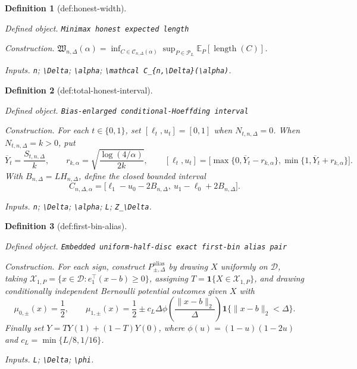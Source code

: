 \documentclass{article}
\newtheorem{definition}{Definition}
\begin{document}
\begin{definition}[def:honest-width]\label{def:honest-width}
\par\smallskip\noindent\emph{Defined object.} \texttt{Minimax honest expected length}
\par\smallskip\noindent\emph{Construction.} \(\mathfrak W_{n,\Delta}(\alpha)=\inf_{C\in\mathcal C_{n,\Delta}(\alpha)}\sup_{P\in\mathcal P_L}\mathbb E_P[\operatorname{length}(C)]\).
\par\smallskip\noindent\emph{Inputs.} \texttt{n}; \texttt{\textbackslash{}\allowbreak{}Delta}; \texttt{\textbackslash{}\allowbreak{}alpha}; \texttt{\textbackslash{}\allowbreak{}mathcal C\_\allowbreak{}\{n,\allowbreak{}\textbackslash{}\allowbreak{}Delta\}\allowbreak{}(\textbackslash{}\allowbreak{}alpha)}.
\end{definition}

\begin{definition}[def:total-honest-interval]\label{def:total-honest-interval}
\par\smallskip\noindent\emph{Defined object.} \texttt{Bias-\allowbreak{}enlarged conditional-\allowbreak{}Hoeffding interval}
\par\smallskip\noindent\emph{Construction.} For each \(t\in\{0,1\}\), set \([\ell_t,u_t]=[0,1]\) when \(N_{t,n,\Delta}=0\).  When \(N_{t,n,\Delta}=k>0\), put
\[
 \overline Y_t=\frac{S_{t,n,\Delta}}k,
 \qquad
 r_{k,\alpha}=\sqrt{\frac{\log(4/\alpha)}{2k}},
 \qquad
 [\ell_t,u_t]=\bigl[\max\{0,\overline Y_t-r_{k,\alpha}\},\min\{1,\overline Y_t+r_{k,\alpha}\}\bigr].
\]
With \(B_{n,\Delta}=LH_{n,\Delta}\), define the closed bounded interval
\[
 C_{n,\Delta,\alpha}
 =\bigl[\ell_1-u_0-2B_{n,\Delta},\ u_1-\ell_0+2B_{n,\Delta}\bigr].
\]
\par\smallskip\noindent\emph{Inputs.} \texttt{n}; \texttt{\textbackslash{}\allowbreak{}Delta}; \texttt{\textbackslash{}\allowbreak{}alpha}; \texttt{L}; \texttt{Z\_\allowbreak{}\textbackslash{}\allowbreak{}Delta}.
\end{definition}

\begin{definition}[def:first-bin-alias]\label{def:first-bin-alias}
\par\smallskip\noindent\emph{Defined object.} \texttt{Embedded uniform-\allowbreak{}half-\allowbreak{}disc exact first-\allowbreak{}bin alias pair}
\par\smallskip\noindent\emph{Construction.} For each sign, construct \(P^{\mathrm{alias}}_{\pm,\Delta}\) by drawing \(X\) uniformly on \(\mathcal D\), taking \(\mathcal X_{1,P}=\{x\in\mathcal D:e_1^{\top}(x-b)\geq0\}\), assigning \(T=\mathbf1\{X\in\mathcal X_{1,P}\}\), and drawing conditionally independent Bernoulli potential outcomes given \(X\) with
\[
 \mu_{0,\pm}(x)=\frac12,
 \qquad
 \mu_{1,\pm}(x)=\frac12\pm c_L\Delta\phi\!\left(\frac{\lVert x-b\rVert_2}{\Delta}\right)
 \mathbf1\{\lVert x-b\rVert_2<\Delta\}.
\]
Finally set \(Y=TY(1)+(1-T)Y(0)\), where \(\phi(u)=(1-u)(1-2u)\) and \(c_L=\min\{L/8,1/16\}\).
\par\smallskip\noindent\emph{Inputs.} \texttt{L}; \texttt{\textbackslash{}\allowbreak{}Delta}; \texttt{\textbackslash{}\allowbreak{}phi}.
\end{definition}
\end{document}
